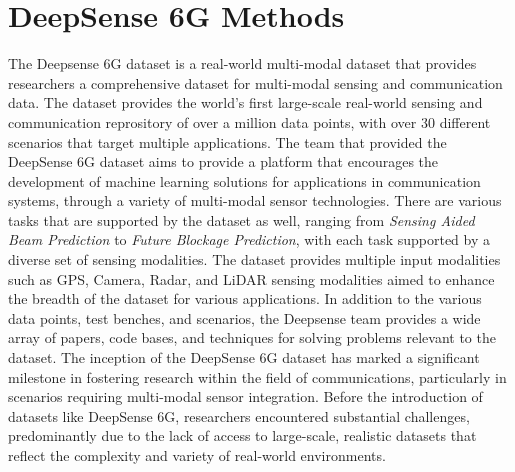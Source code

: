 \section{DeepSense 6G Methods}
The Deepsense 6G dataset is a real-world multi-modal dataset that provides researchers a comprehensive dataset for multi-modal sensing and communication data. The dataset provides the world's first large-scale real-world sensing and communication reprository of over a million data points, with over 30 different scenarios that target multiple applications. The team that provided the DeepSense 6G dataset aims to provide a platform that encourages the development of machine learning solutions for applications in communication systems, through a variety of multi-modal sensor technologies. There are various tasks that are supported by the dataset as well, ranging from \textit{Sensing Aided Beam Prediction} to \textit{Future Blockage Prediction}, with each task supported by a diverse set of sensing modalities. The dataset provides multiple input modalities such as GPS, Camera, Radar, and LiDAR sensing modalities aimed to enhance the breadth of the dataset for various applications. In addition to the various data points, test benches, and scenarios, the Deepsense team provides a wide array of papers, code bases, and techniques for solving problems relevant to the dataset. The inception of the DeepSense 6G dataset has marked a significant milestone in fostering research within the field of communications, particularly in scenarios requiring multi-modal sensor integration. Before the introduction of datasets like DeepSense 6G, researchers encountered substantial challenges, predominantly due to the lack of access to large-scale, realistic datasets that reflect the complexity and variety of real-world environments. \cite{alkhateeb2023deepsense}

